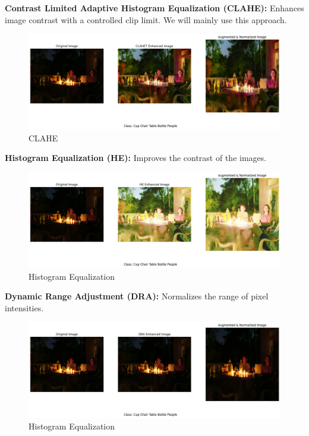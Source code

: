 \documentclass{article} %
\begin{document}
\textbf{Contrast Limited Adaptive Histogram Equalization (CLAHE):} Enhances image contrast with a controlled clip limit. We will mainly use this approach.


\begin{figure}[h]
  \centering
  \includegraphics[width=\textwidth]{./figure+object/CLAHET.png}
  \caption{CLAHE}
  \label{fig:clahe}
\end{figure}\hfill


\textbf{Histogram Equalization (HE):} Improves the contrast of the images.


\begin{figure}[h]
  \centering
  \includegraphics[width=\textwidth]{./figure+object/HE.png}
  \caption{Histogram Equalization}
  \label{fig:he}
\end{figure}\hfill


\textbf{Dynamic Range Adjustment (DRA):} Normalizes the range of pixel intensities.


\begin{figure}[h]
  \centering
  \includegraphics[width=\textwidth]{./figure+object/DRA.png}
  \caption{Histogram Equalization}
  \label{fig:dra}
\end{figure}\hfill
\end{document}
